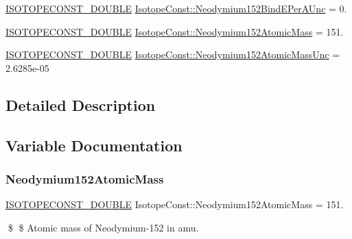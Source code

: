 \begin{DoxyCompactItemize}
\mbox{\hyperlink{group___isotope_const-_macros_ga8f45a7272ce02c0b4c65c44636ed719a}{I\+S\+O\+T\+O\+P\+E\+C\+O\+N\+S\+T\+\_\+\+D\+O\+U\+B\+LE}} \mbox{\hyperlink{group___isotope_const-_neodymium-_nd152_ga6aafa6a59017da2e118b499d14c72161}{Isotope\+Const\+::\+Neodymium152\+Bind\+E\+Per\+A\+Unc}} = 0.
\item 
\mbox{\hyperlink{group___isotope_const-_macros_ga8f45a7272ce02c0b4c65c44636ed719a}{I\+S\+O\+T\+O\+P\+E\+C\+O\+N\+S\+T\+\_\+\+D\+O\+U\+B\+LE}} \mbox{\hyperlink{group___isotope_const-_neodymium-_nd152_ga54930f2390fbfcf1a29485db19139795}{Isotope\+Const\+::\+Neodymium152\+Atomic\+Mass}} = 151.
\item 
\mbox{\hyperlink{group___isotope_const-_macros_ga8f45a7272ce02c0b4c65c44636ed719a}{I\+S\+O\+T\+O\+P\+E\+C\+O\+N\+S\+T\+\_\+\+D\+O\+U\+B\+LE}} \mbox{\hyperlink{group___isotope_const-_neodymium-_nd152_ga299df0a37c09fe1f8068bf56405cdb78}{Isotope\+Const\+::\+Neodymium152\+Atomic\+Mass\+Unc}} = 2.\+6285e-\/05
\end{DoxyCompactItemize}


\subsection{Detailed Description}


\subsection{Variable Documentation}
\mbox{\label{group___isotope_const-_neodymium-_nd152_ga54930f2390fbfcf1a29485db19139795}} 
\subsubsection{\texorpdfstring{Neodymium152\+Atomic\+Mass}{Neodymium152AtomicMass}}
{\footnotesize\ttfamily \mbox{\hyperlink{group___isotope_const-_macros_ga8f45a7272ce02c0b4c65c44636ed719a}{I\+S\+O\+T\+O\+P\+E\+C\+O\+N\+S\+T\+\_\+\+D\+O\+U\+B\+LE}} Isotope\+Const\+::\+Neodymium152\+Atomic\+Mass = 151.}

\$ \$ Atomic mass of Neodymium-\/152 in amu. \mbox{\label{group___isotope_const-_neodymium-_nd152_ga299df0a37c09fe1f8068bf56405cdb78}} 
